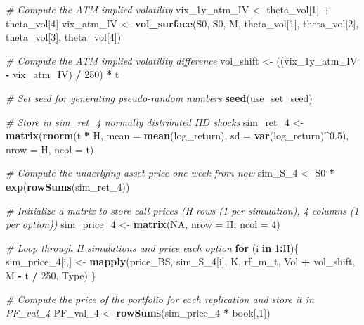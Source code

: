 \documentclass[]{article}
\newenvironment{Shaded}{\begin{snugshade}}{\end{snugshade}}
\newcommand{\CommentTok}[1]{\textcolor[rgb]{0.56,0.35,0.01}{\textit{#1}}}
\newcommand{\ControlFlowTok}[1]{\textcolor[rgb]{0.13,0.29,0.53}{\textbf{#1}}}
\newcommand{\DataTypeTok}[1]{\textcolor[rgb]{0.13,0.29,0.53}{#1}}
\newcommand{\DecValTok}[1]{\textcolor[rgb]{0.00,0.00,0.81}{#1}}
\newcommand{\FloatTok}[1]{\textcolor[rgb]{0.00,0.00,0.81}{#1}}
\newcommand{\KeywordTok}[1]{\textcolor[rgb]{0.13,0.29,0.53}{\textbf{#1}}}
\newcommand{\NormalTok}[1]{#1}
\newcommand{\OperatorTok}[1]{\textcolor[rgb]{0.81,0.36,0.00}{\textbf{#1}}}
\newcommand{\OtherTok}[1]{\textcolor[rgb]{0.56,0.35,0.01}{#1}}
\newcommand{\StringTok}[1]{\textcolor[rgb]{0.31,0.60,0.02}{#1}}
\begin{document}
\begin{Shaded}
\begin{Highlighting}[]
\CommentTok{\# Compute the ATM implied volatility}
\NormalTok{vix\_1y\_atm\_IV <{-}}\StringTok{ }\NormalTok{theta\_vol[}\DecValTok{1}\NormalTok{] }\OperatorTok{+}\StringTok{ }\NormalTok{theta\_vol[}\DecValTok{4}\NormalTok{]}
\NormalTok{vix\_atm\_IV    <{-}}\StringTok{ }\KeywordTok{vol\_surface}\NormalTok{(S0, S0, M, theta\_vol[}\DecValTok{1}\NormalTok{], theta\_vol[}\DecValTok{2}\NormalTok{], theta\_vol[}\DecValTok{3}\NormalTok{], theta\_vol[}\DecValTok{4}\NormalTok{])}

\CommentTok{\# Compute the ATM implied volatility difference}
\NormalTok{vol\_shift     <{-}}\StringTok{ }\NormalTok{((vix\_1y\_atm\_IV }\OperatorTok{{-}}\StringTok{ }\NormalTok{vix\_atm\_IV) }\OperatorTok{/}\StringTok{ }\DecValTok{250}\NormalTok{) }\OperatorTok{*}\StringTok{ }\NormalTok{t}

\CommentTok{\# Set seed for generating pseudo{-}random numbers}
\KeywordTok{seed}\NormalTok{(use\_set\_seed)}

\CommentTok{\# Store in \textquotesingle{}sim\_ret\_4\textquotesingle{} normally distributed IID shocks }
\NormalTok{sim\_ret\_}\DecValTok{4}\NormalTok{ <{-}}\StringTok{ }\KeywordTok{matrix}\NormalTok{(}\KeywordTok{rnorm}\NormalTok{(t }\OperatorTok{*}\StringTok{ }\NormalTok{H, }\DataTypeTok{mean =} \KeywordTok{mean}\NormalTok{(log\_return), }\DataTypeTok{sd =} \KeywordTok{var}\NormalTok{(log\_return)}\OperatorTok{\^{}}\FloatTok{0.5}\NormalTok{), }\DataTypeTok{nrow =}\NormalTok{ H, }\DataTypeTok{ncol =}\NormalTok{ t)}

\CommentTok{\# Compute the underlying asset price one week from now}
\NormalTok{sim\_S\_}\DecValTok{4}\NormalTok{   <{-}}\StringTok{ }\NormalTok{S0 }\OperatorTok{*}\StringTok{ }\KeywordTok{exp}\NormalTok{(}\KeywordTok{rowSums}\NormalTok{(sim\_ret\_}\DecValTok{4}\NormalTok{))}

\CommentTok{\# Initialize a matrix to store call prices (H rows (1 per simulation), 4 columns (1 per option))}
\NormalTok{sim\_price\_}\DecValTok{4}\NormalTok{ <{-}}\StringTok{ }\KeywordTok{matrix}\NormalTok{(}\OtherTok{NA}\NormalTok{, }\DataTypeTok{nrow =}\NormalTok{ H, }\DataTypeTok{ncol =} \DecValTok{4}\NormalTok{)}

\CommentTok{\# Loop through H simulations and price each option}
\ControlFlowTok{for}\NormalTok{ (i }\ControlFlowTok{in} \DecValTok{1}\OperatorTok{:}\NormalTok{H)\{}
\NormalTok{  sim\_price\_}\DecValTok{4}\NormalTok{[i,] <{-}}\StringTok{ }\KeywordTok{mapply}\NormalTok{(price\_BS, sim\_S\_}\DecValTok{4}\NormalTok{[i], K, rf\_m\_t, Vol }\OperatorTok{+}\StringTok{ }\NormalTok{vol\_shift, M }\OperatorTok{{-}}\StringTok{ }\NormalTok{t }\OperatorTok{/}\StringTok{ }\DecValTok{250}\NormalTok{, Type)}
\NormalTok{\}}

\CommentTok{\# Compute the price of the portfolio for each replication and store it in \textquotesingle{}PF\_val\_4\textquotesingle{}}
\NormalTok{PF\_val\_}\DecValTok{4}\NormalTok{ <{-}}\StringTok{ }\KeywordTok{rowSums}\NormalTok{(sim\_price\_}\DecValTok{4} \OperatorTok{*}\StringTok{ }\NormalTok{book[,}\DecValTok{1}\NormalTok{])}
\end{Highlighting}
\end{Shaded}
\end{document}
